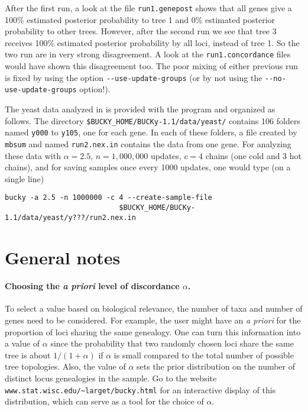\documentclass[12pt,english,final,letterpaper]{article}
\begin{document}
After the first run, a look at the file {\tt run1.genepost} shows that all 
genes give a 100\% estimated posterior probability to tree 1 and 0\% estimated
posterior probability to other trees. However, after the second run we
see that tree 3 receives 100\% estimated posterior probability by all loci, 
instead of tree 1. So the two run are in very strong disagreement. 
A look at the {\tt run1.concordance} files would have shown this disagreement
too. The poor mixing of either previous run is fixed by using the option
\verb+--use-update-groups+ (or by not using the \verb+--no-use-update-groups+
option!).
\medskip

The yeast data analyzed in \cite{ane-etal-2006} is provided with the program
and organized as follows. The directory
\verb+$BUCKY_HOME/BUCKy-1.1/data/yeast/+ %
contains 106 folders named {\tt y000} to {\tt y105}, one for each gene. 
In each of these folders, a file created by {\tt mbsum} and named 
{\tt run2.nex.in} contains the data from one gene.
For analyzing these data with $\alpha=2.5$, 
$n=1,000,000$ updates, $c=4$ chains (one cold and 3 hot chains), and for
saving samples once every 1000 updates, one would type (on a single line)
\begin{verbatim}
bucky -a 2.5 -n 1000000 -c 4 --create-sample-file 
                           $BUCKY_HOME/BUCKy-1.1/data/yeast/y???/run2.nex.in
\end{verbatim}%
    

\section{General notes}
\paragraph{Choosing the {\it a priori} level of discordance $\alpha$.}
To select a value based on biological relevance, the number of taxa and 
number of genes need to be considered. For example, the user might have an 
{\it a priori} for the proportion of loci sharing the same genealogy. One 
can turn this information into a value of $\alpha$ since the probability that 
two randomly chosen loci share the same tree is about $1/(1+\alpha)$ if 
$\alpha$ is small compared to the total number of possible tree topologies. 
Also, the value of $\alpha$ sets the prior distribution on the number of 
distinct locus genealogies in the sample. 
Go to the website \verb+www.stat.wisc.edu/~larget/bucky.html+ 
for an interactive display of this distribution, which can
serve as a tool for the choice of $\alpha$. 
\end{document}
